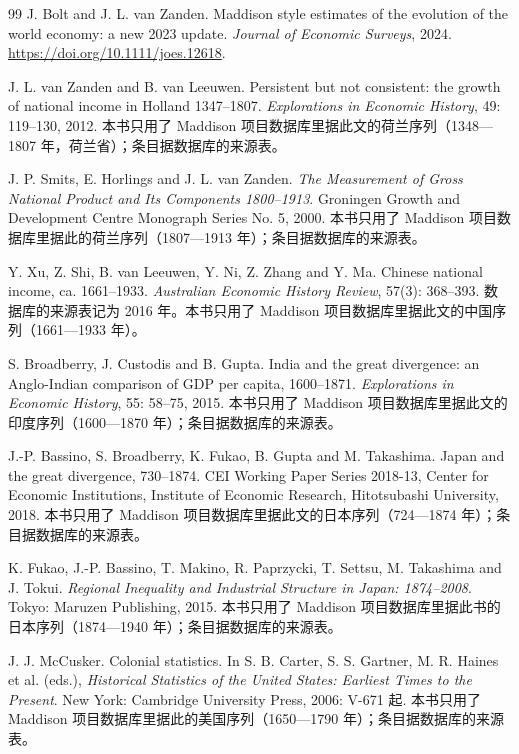 \begin{thebibliography}{99}
 J. Bolt and J. L. van Zanden. Maddison style estimates of the evolution of the world economy: a new 2023 update. \emph{Journal of Economic Surveys}, 2024. \url{https://doi.org/10.1111/joes.12618}.

 J. L. van Zanden and B. van Leeuwen. Persistent but not consistent: the growth of national income in Holland 1347--1807. \emph{Explorations in Economic History}, 49: 119--130, 2012. 本书只用了 Maddison 项目数据库里据此文的荷兰序列（1348—1807 年，荷兰省）；条目据数据库的来源表。

 J. P. Smits, E. Horlings and J. L. van Zanden. \emph{The Measurement of Gross National Product and Its Components 1800--1913}. Groningen Growth and Development Centre Monograph Series No. 5, 2000. 本书只用了 Maddison 项目数据库里据此的荷兰序列（1807—1913 年）；条目据数据库的来源表。

 Y. Xu, Z. Shi, B. van Leeuwen, Y. Ni, Z. Zhang and Y. Ma. Chinese national income, ca. 1661--1933. \emph{Australian Economic History Review}, 57(3): 368--393. 数据库的来源表记为 2016 年。本书只用了 Maddison 项目数据库里据此文的中国序列（1661—1933 年）。

 S. Broadberry, J. Custodis and B. Gupta. India and the great divergence: an Anglo-Indian comparison of GDP per capita, 1600--1871. \emph{Explorations in Economic History}, 55: 58--75, 2015. 本书只用了 Maddison 项目数据库里据此文的印度序列（1600—1870 年）；条目据数据库的来源表。

 J.-P. Bassino, S. Broadberry, K. Fukao, B. Gupta and M. Takashima. Japan and the great divergence, 730--1874. CEI Working Paper Series 2018-13, Center for Economic Institutions, Institute of Economic Research, Hitotsubashi University, 2018. 本书只用了 Maddison 项目数据库里据此文的日本序列（724—1874 年）；条目据数据库的来源表。

 K. Fukao, J.-P. Bassino, T. Makino, R. Paprzycki, T. Settsu, M. Takashima and J. Tokui. \emph{Regional Inequality and Industrial Structure in Japan: 1874--2008}. Tokyo: Maruzen Publishing, 2015. 本书只用了 Maddison 项目数据库里据此书的日本序列（1874—1940 年）；条目据数据库的来源表。

 J. J. McCusker. Colonial statistics. In S. B. Carter, S. S. Gartner, M. R. Haines et al. (eds.), \emph{Historical Statistics of the United States: Earliest Times to the Present}. New York: Cambridge University Press, 2006: V-671 起. 本书只用了 Maddison 项目数据库里据此的美国序列（1650—1790 年）；条目据数据库的来源表。


\end{thebibliography}
